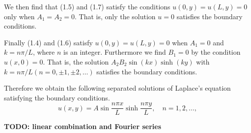 We then find that (1.5) and (1.7) satisfy the conditions $u(0, y)=u(L, y)=0$ only when $A_1=A_2=0$. That is, only the solution $u=0$ satisfies the boundary conditions.

Finally (1.4) and (1.6) satisfy $u(0, y)=u(L, y)=0$ when $A_1=0$ and $k=n \pi / L$, where $n$ is an integer. Furthermore we find $B_1=0$ by the condition $u(x, 0)=0$. That is, the solution $A_2 B_2 \sin (k x) \sinh (k y)$ with $k=n \pi / L(n=0, \pm 1, \pm 2, \ldots)$ satisfies the boundary conditions.

Therefore we obtain the following separated solutions of Laplace's equation satisfying the boundary conditions.
\begin{equation*}
u(x, y)=A \sin \frac{n \pi x}{L} \sinh \frac{n \pi y}{L}, \quad n=1,2, \ldots,
\end{equation*}

\textbf{TODO: linear combination and Fourier series}